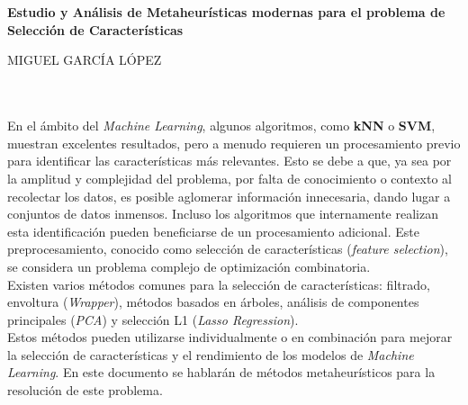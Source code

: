 \chapter*{}


\cleardoublepage
\thispagestyle{empty}

\begin{center}
       {\large\bfseries Estudio y Análisis de Metaheurísticas modernas para el problema de Selección de Características}\\
\end{center}
\begin{center}
       MIGUEL GARCÍA LÓPEZ\\
\end{center}

\\

\vspace{0.7cm}
\\

En el ámbito del \textit{Machine Learning}, algunos algoritmos, como \textbf{kNN} o \textbf{SVM}, muestran excelentes resultados, pero a menudo requieren un procesamiento previo para identificar las características más relevantes. Esto se debe a que, ya sea por la amplitud y complejidad del problema, por falta de conocimiento o contexto al recolectar los datos, es posible aglomerar información innecesaria, dando lugar a conjuntos de datos inmensos. Incluso los algoritmos que internamente realizan esta identificación pueden beneficiarse de un procesamiento adicional. Este preprocesamiento, conocido como selección de características (\textit{feature selection}), se considera un problema complejo de optimización combinatoria.\\[6pt]

Existen varios métodos comunes para la selección de características: filtrado, envoltura (\textit{Wrapper}), métodos basados en árboles, análisis de componentes principales (\textit{PCA}) y selección L1 (\textit{Lasso Regression}).\\[6pt]

Estos métodos pueden utilizarse individualmente o en combinación para mejorar la selección de características y el rendimiento de los modelos de \textit{Machine Learning}. En este documento se hablarán de métodos metaheurísticos para la resolución de este problema.\\[6pt]

